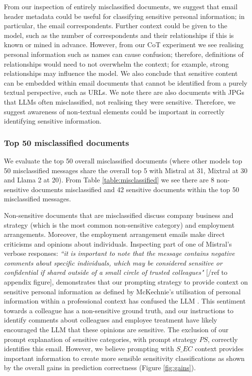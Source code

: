 From our inspection of entirely misclassified documents, we suggest that email header metadata could be useful for classifying sensitive personal information; in particular, the email correspondents. Further context could be given to the model, such as the number of correspondents and their relationships if this is known or mined in advance. However, from our CoT experiment we see realising personal information such as names can cause confusion; therefore, definitions of relationships would need to not overwhelm the context; for example, strong relationships may influence the model. We also conclude that sensitive content can be embedded within email documents that cannot be identified from a purely textual perspective, such as URLs. We note there are also documents with JPGs that LLMs often misclassified, not realising they were sensitive. Therefore, we suggest awareness of non-textual elements could be important in correctly identifying sensitive information.

\subsubsection{Top 50 misclassified documents}
We evaluate the top 50 overall misclassified documents (where other models top 50 misclassified messages share the overall top 5 with Mistral at 31, Mixtral at 30 and Llama 2 at 20). From Table \ref{table:misclassified} we see there are 8 non-sensitive documents misclassified and 42 sensitive documents within the top 50 misclassified messages.

Non-sensitive documents that are misclassified discuss company business and strategy (which is the most common non-sensitive category) and employment arrangements. Moreover, the employment arrangement emails make direct criticisms and opinions about individuals. Inspecting part of one of Mistral’s verbose responses: \textit{``it is important to note that the message contains negative comments about specific individuals, which may be considered sensitive or confidential if shared outside of a small circle of trusted colleagues"} [/ref to appendix figure], demonstrates that our prompting strategy to provide context on sensitive personal information as defined by McKechnie’s utilisation of personal information within a professional context has confused the LLM \cite{mckechnie2024sara}. This sentiment towards a colleague has a non-sensitive ground truth, and our instructions to identify comments about colleagues and employee treatment have likely encouraged the LLM that these opinions are sensitive. The exclusion of our prompt explanation of sensitive categories, with prompt strategy $PS$, correctly identifies this email. However, we believe prompting with $S\_EC$ context provides important information to create more sensible sensitivity classifications as shown by the overall gains in prediction correctness (Figure \ref{fig:gains}).

